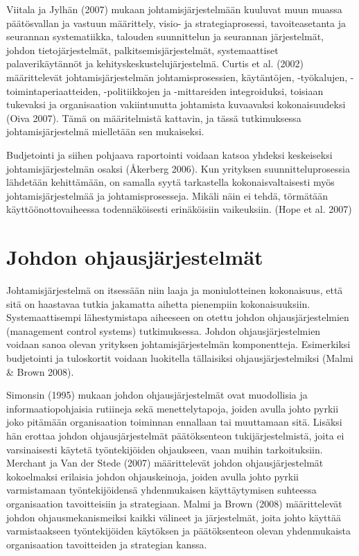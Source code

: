 \documentclass[12pt,a4paper,oneside,pdftex]{report}
\begin{document}
Viitala ja Jylhän (2007) mukaan johtamisjärjestelmään kuuluvat muun muassa päätösvallan ja vastuun määrittely, visio- ja strategiaprosessi, tavoiteasetanta ja seurannan systematiikka, talouden suunnittelun ja seurannan järjestelmät, johdon tietojärjestelmät, palkitsemisjärjestelmät, systemaattiset palaverikäytännöt ja kehityskeskustelujärjestelmä. Curtis et al. (2002) määrittelevät johtamisjärjestelmän johtamisprosessien,  käytäntöjen, -työkalujen, -toimintaperiaatteiden, -politiikkojen ja -mittareiden integroiduksi, toisiaan tukevaksi ja organisaation vakiintunutta johtamista kuvaavaksi kokonaisuudeksi (Oiva 2007). Tämä on määritelmistä kattavin, ja tässä tutkimuksessa johtamisjärjestelmä mielletään sen mukaiseksi.

Budjetointi ja siihen pohjaava raportointi voidaan katsoa yhdeksi keskeiseksi johtamisjärjestelmän osaksi (Åkerberg 2006). Kun yrityksen suunnitteluprosessia lähdetään kehittämään, on samalla syytä tarkastella kokonaisvaltaisesti myös johtamisjärjestelmää ja johtamisprosesseja. Mikäli näin ei tehdä, törmätään käyttöönottovaiheessa todennäköisesti erinäköisiin vaikeuksiin. (Hope et al. 2007)

\section{Johdon ohjausjärjestelmät}

Johtamisjärjestelmä on itsessään niin laaja ja moniulotteinen kokonaisuus, että sitä on haastavaa tutkia jakamatta aihetta pienempiin kokonaisuuksiin. Systemaattisempi lähestymistapa aiheeseen on otettu johdon ohjausjärjestelmien (management control systems) tutkimuksessa. Johdon ohjausjärjestelmien voidaan sanoa olevan yrityksen johtamisjärjestelmän komponentteja. Esimerkiksi budjetointi ja tuloskortit voidaan luokitella tällaisiksi ohjausjärjestelmiksi (Malmi & Brown 2008).

Simonsin (1995) mukaan johdon ohjausjärjestelmät ovat muodollisia ja informaatiopohjaisia rutiineja sekä menettelytapoja, joiden avulla johto pyrkii joko pitämään organisaation toiminnan ennallaan tai muuttamaan sitä. Lisäksi hän erottaa johdon ohjausjärjestelmät päätöksenteon tukijärjestelmistä, joita ei varsinaisesti käytetä työntekijöiden ohjaukseen, vaan muihin tarkoituksiin. Merchant ja Van der Stede (2007) määrittelevät johdon ohjausjärjestelmät kokoelmaksi erilaisia johdon ohjauskeinoja, joiden avulla johto pyrkii varmistamaan työntekijöidensä yhdenmukaisen käyttäytymisen suhteessa organisaation tavoitteisiin ja strategiaan. Malmi ja Brown (2008) määrittelevät johdon ohjausmekanismeiksi kaikki välineet ja järjestelmät, joita johto käyttää varmistaakseen työntekijöiden käytöksen ja päätöksenteon olevan yhdenmukaista organisaation tavoitteiden ja strategian kanssa. 
\end{document}
